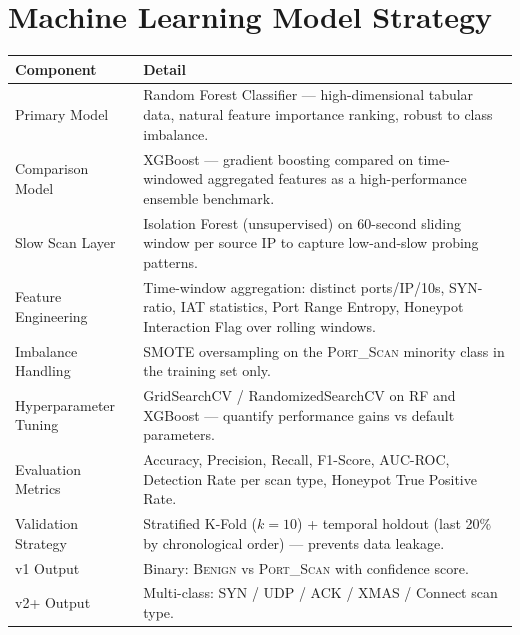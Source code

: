 \documentclass[12pt,a4paper]{article}
\begin{document}
\section{Machine Learning Model Strategy}

\begin{table}[h!]
\centering
\small
\begin{tabular}{L{4.2cm} L{10.5cm}}
  \toprule
  \textbf{Component} & \textbf{Detail} \\
  \midrule
  Primary Model         & Random Forest Classifier --- high-dimensional tabular data,
                          natural feature importance ranking, robust to class imbalance. \\
  Comparison Model      & XGBoost --- gradient boosting compared on time-windowed
                          aggregated features as a high-performance ensemble benchmark. \\
  Slow Scan Layer       & Isolation Forest (unsupervised) on 60-second sliding window
                          per source IP to capture low-and-slow probing patterns. \\
  Feature Engineering   & Time-window aggregation: distinct ports/IP/10s, SYN-ratio,
                          IAT statistics, Port Range Entropy, Honeypot Interaction Flag
                          over rolling windows. \\
  Imbalance Handling    & SMOTE oversampling on the \textsc{Port\_Scan} minority class
                          in the training set only. \\
  Hyperparameter Tuning & GridSearchCV / RandomizedSearchCV on RF and XGBoost ---
                          quantify performance gains vs default parameters. \\
  Evaluation Metrics    & Accuracy, Precision, Recall, F1-Score, AUC-ROC, Detection
                          Rate per scan type, Honeypot True Positive Rate. \\
  Validation Strategy   & Stratified K-Fold ($k=10$) + temporal holdout (last 20\% by
                          chronological order) --- prevents data leakage. \\
  v1 Output             & Binary: \textsc{Benign} vs \textsc{Port\_Scan} with
                          confidence score. \\
  v2+ Output            & Multi-class: SYN / UDP / ACK / XMAS / Connect scan type. \\
  \bottomrule
\end{tabular}
\end{table}
\end{document}
